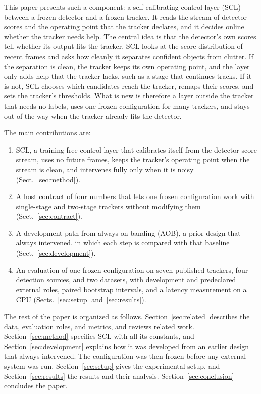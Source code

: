 \documentclass[pdflatex,sn-mathphys-num,iicol]{sn-jnl}
\newcommand{\scl}{SCL}
\newcommand{\aob}{AOB}
\begin{document}
This paper presents such a component: a self-calibrating control layer (\scl{})
between a frozen detector and a frozen tracker. It reads the stream of detector scores
and the operating point that the tracker declares, and it decides online
whether the tracker needs help. The central idea is that the detector's own
scores tell whether its output fits the tracker. \scl{} looks at the score
distribution of recent frames and asks how cleanly it separates confident
objects from clutter. If the separation is clean, the tracker keeps its own
operating point, and the layer only adds help that the tracker lacks, such as
a stage that continues tracks. If it is not, \scl{} chooses which candidates reach the
tracker, remaps their scores, and sets the tracker's thresholds. What is new
is therefore a layer outside the tracker that needs no labels, uses one frozen
configuration for many trackers, and stays out of the way when the tracker
already fits the detector.

The main contributions are:
\begin{enumerate}
\item \scl{}, a training-free control layer that calibrates itself from the detector
      score stream, uses no future frames, keeps the tracker's operating point
      when the stream is clean, and intervenes fully only when it is noisy
      (Sect.~\ref{sec:method}).
\item A host contract of four numbers that lets one frozen configuration work
      with single-stage and two-stage trackers
      without modifying them (Sect.~\ref{sec:contract}).
\item A development path from always-on banding (\aob{}), a prior design that
      always intervened, in which
      each step is compared with that baseline (Sect.~\ref{sec:development}).
\item An evaluation of one frozen configuration on seven published trackers,
      four detection sources, and two datasets, with development and
      predeclared external roles, paired bootstrap intervals, and a
      latency measurement on a CPU (Sects.~\ref{sec:setup}
      and~\ref{sec:results}).
\end{enumerate}

The rest of the paper is organized as follows. Section~\ref{sec:related}
describes the data, evaluation roles, and metrics, and reviews related work. Section~\ref{sec:method} specifies \scl{} with all its
constants, and Section~\ref{sec:development} explains how it was developed
from an earlier design that always intervened. The configuration was then
frozen before any external system was run.
Section~\ref{sec:setup} gives the experimental setup, and
Section~\ref{sec:results} the results and their analysis. Section~\ref{sec:conclusion} concludes the paper.
\end{document}
